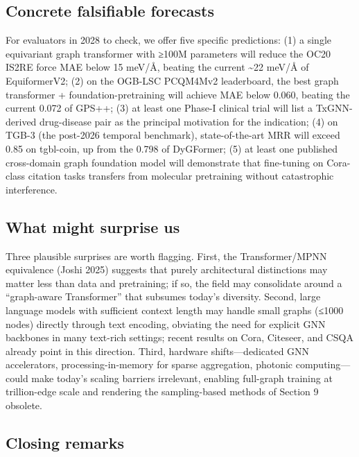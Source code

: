 \subsection{Concrete falsifiable forecasts}\label{concrete-falsifiable-forecasts}

For evaluators in 2028 to check, we offer five specific predictions: (1) a single equivariant graph transformer with ≥100M parameters will reduce the OC20 IS2RE force MAE below 15 meV/Å, beating the current \textasciitilde22 meV/Å of EquiformerV2; (2) on the OGB-LSC PCQM4Mv2 leaderboard, the best graph transformer + foundation-pretraining will achieve MAE below 0.060, beating the current 0.072 of GPS++; (3) at least one Phase-I clinical trial will list a TxGNN-derived drug-disease pair as the principal motivation for the indication; (4) on TGB-3 (the post-2026 temporal benchmark), state-of-the-art MRR will exceed 0.85 on tgbl-coin, up from the 0.798 of DyGFormer; (5) at least one published cross-domain graph foundation model will demonstrate that fine-tuning on Cora-class citation tasks transfers from molecular pretraining without catastrophic interference.

\subsection{What might surprise us}\label{what-might-surprise-us}

Three plausible surprises are worth flagging. First, the Transformer/MPNN equivalence (Joshi 2025) suggests that purely architectural distinctions may matter less than data and pretraining; if so, the field may consolidate around a ``graph-aware Transformer'' that subsumes today's diversity. Second, large language models with sufficient context length may handle small graphs (≤1000 nodes) directly through text encoding, obviating the need for explicit GNN backbones in many text-rich settings; recent results on Cora, Citeseer, and CSQA already point in this direction. Third, hardware shifts---dedicated GNN accelerators, processing-in-memory for sparse aggregation, photonic computing---could make today's scaling barriers irrelevant, enabling full-graph training at trillion-edge scale and rendering the sampling-based methods of Section 9 obsolete.

\subsection{Closing remarks}\label{closing-remarks}

